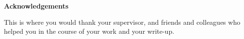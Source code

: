 
\vspace*{5cm}
\begin{center}

\textbf{Acknowledgements}
\end{center}

\normalsize

This is where you would thank your supervisor, and friends and colleagues
who helped you in the course of your work and your write-up.

